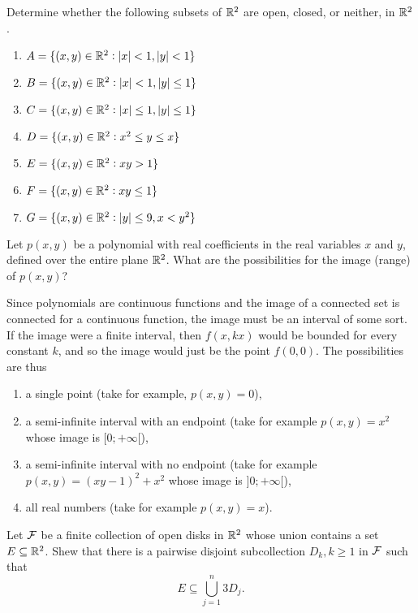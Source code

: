 \section*{}
\begin{multicols}{2}\columnseprule 1pt \columnsep 25pt
\begin{problem}
Determine whether the following subsets of $\mathbb{R}^2$ are open,
closed, or neither, in $\mathbb{R}^2$.
\begin{enumerate}
\item $A=\{(x,y)\in\mathbb{R}^2: |x|<1, |y|<1\}$
\item  $B=\{(x,y)\in\mathbb{R}^2: |x|<1, |y|\leq 1\}$
\item  $C=\{(x,y)\in\mathbb{R}^2: |x|\leq 1, |y|\leq 1\}$
\item  $D=\{(x,y)\in\mathbb{R}^2: x^2\leq y \leq x\}$
\item  $E=\{(x,y)\in\mathbb{R}^2: xy>1\}$
\item  $F=\{(x,y)\in\mathbb{R}^2: xy\leq 1\}$
\item  $G=\{(x,y)\in\mathbb{R}^2: |y|\leq 9, x<y^2\}$
\end{enumerate}
\end{problem}
\begin{problem} Let $p(x,y)$ be a polynomial with real
coefficients in the real variables $x$ and $y$, defined over the
entire plane $\mathbb{R}^2$. What are the possibilities for the image
(range) of $p(x,y)$? \begin{answer} Since polynomials are continuous
functions and the image of a connected set is connected for a
continuous function, the image must be an interval of some sort. If
the image were a finite interval, then $f(x,kx)$ would be bounded
for every constant $k$, and so the image would just be the point
$f(0,0).$ The possibilities are thus
\begin{enumerate}\item  a single point (take for example,
$p(x,y)= 0$), \item  a semi-infinite interval with an endpoint (take
for example $p(x,y) = x^2$ whose image is $[0; +\infty[$),
\item  a semi-infinite interval with no endpoint (take for example
$p(x,y) = (xy - 1)^2 + x^2$ whose image is $]0; +\infty[$),
\item  all real numbers (take for example $p(x,y) =
x$).
\end{enumerate}
\end{answer}
\end{problem}
\begin{problem}[Putnam 1998] Let ${\cal F}$ be a finite collection of
open disks in $\mathbb{R}^2$ whose union contains a set $E\subseteq
\mathbb{R}^2$. Shew that there is a pairwise disjoint subcollection
$D_k, k \geq 1$ in ${\cal F}$ such that
$$E\subseteq \bigcup _{j=1} ^n 3D_j.  $$


\end{problem}
\end{multicols}

